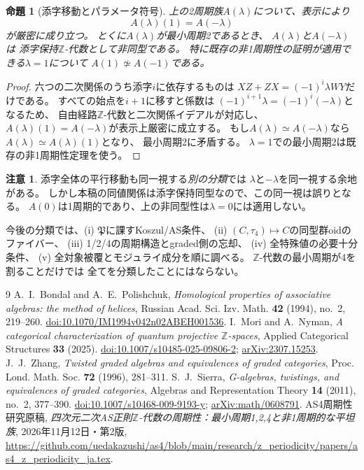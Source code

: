 \documentclass[11pt,a4paper]{ltjsarticle}
\newtheorem{proposition}[theorem]{命題}
\theoremstyle{definition}
\newtheorem{remark}[theorem]{注意}
\begin{document}
\begin{proposition}[添字移動とパラメータ符号]\label{prop:period-two-sign}
上の2周期族$A(\lambda)$について、表示により
\[
 A(\lambda)(1)=A(-\lambda)
\]
が厳密に成り立つ。
とくに$A(\lambda)$が最小周期2であるとき、
$A(\lambda)$と$A(-\lambda)$は
\emph{添字保持$\mathbb Z$-代数として非同型}である。
特に既存の非1周期性の証明が適用できる$\lambda=1$について
$A(1)\not\simeq A(-1)$である。
\end{proposition}
\begin{proof}
六つの二次関係のうち添字$i$に依存するものは
$XZ+ZX=(-1)^i\lambda WY$だけである。
すべての始点を$i+1$に移すと係数は
$(-1)^{i+1}\lambda=(-1)^i(-\lambda)$となるため、
自由経路$\mathbb Z$-代数と二次関係イデアルが対応し、
$A(\lambda)(1)=A(-\lambda)$が表示上厳密に成立する。
もし$A(\lambda)\simeq A(-\lambda)$なら
$A(\lambda)\simeq A(\lambda)(1)$となり、
最小周期2に矛盾する。
$\lambda=1$での最小周期2は既存の非1周期性定理を使う。
\end{proof}
\begin{remark}
添字全体の平行移動も同一視する\emph{別の分類}では
$\lambda$と$-\lambda$を同一視する余地がある。
しかし本稿の同値関係は添字保持同型なので、この同一視は誤りとなる。
$A(0)$は1周期的であり、上の非同型性は$\lambda=0$には適用しない。
\end{remark}

今後の分類では、(i) $\mathfrak P$に課すKoszul/AS条件、
(ii) $(C,\tau_4)\mapsto C$の同型群oidのファイバー、
(iii) 1/2/4の周期構造とgraded側の忘却、
(iv) 全特殊値の必要十分条件、
(v) 全対象被覆とモジュライ成分を順に調べる。
$\mathbb Z$-代数の最小周期が4を割ることだけでは
全てを分類したことにはならない。

\begin{thebibliography}{9}
A.~I.~Bondal and A.~E.~Polishchuk,
\emph{Homological properties of associative algebras: the method of helices},
Russian Acad. Sci. Izv. Math. \textbf{42} (1994), no.~2, 219--260.
\href{https://doi.org/10.1070/IM1994v042n02ABEH001536}{doi:10.1070/IM1994v042n02ABEH001536}.
I.~Mori and A.~Nyman,
\emph{A categorical characterization of quantum projective $\mathbb Z$-spaces},
Applied Categorical Structures \textbf{33} (2025).
\href{https://doi.org/10.1007/s10485-025-09806-2}{doi:10.1007/s10485-025-09806-2};
\href{https://arxiv.org/abs/2307.15253}{arXiv:2307.15253}.
J.~J.~Zhang, \emph{Twisted graded algebras and equivalences of graded categories},
Proc. Lond. Math. Soc. \textbf{72} (1996), 281--311.
S.~J.~Sierra, \emph{G-algebras, twistings, and equivalences of graded categories},
Algebras and Representation Theory \textbf{14} (2011), no.~2, 377--390.
\href{https://doi.org/10.1007/s10468-009-9193-y}{doi:10.1007/s10468-009-9193-y};
\href{https://arxiv.org/abs/math/0608791}{arXiv:math/0608791}.
AS4周期性研究原稿, 
\emph{四次元二次AS正則$\mathbb Z$-代数の周期性：最小周期1,2,4と非1周期的な平坦族},
2026年11月12日・第2版,
\url{https://github.com/uedakazushi/as4/blob/main/research/z_periodicity/papers/as4_z_periodicity_ja.tex}.
\end{thebibliography}
\end{document}
